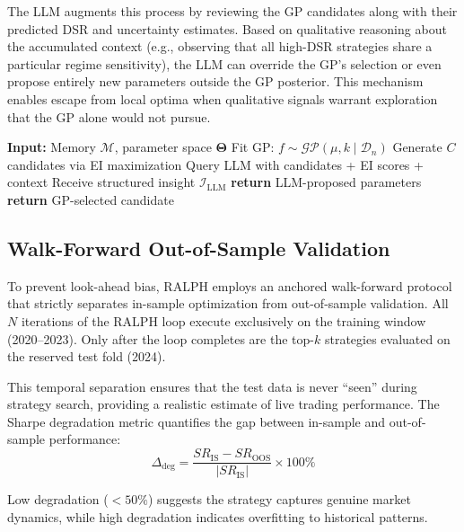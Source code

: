 \documentclass[conference]{IEEEtran}
\begin{document}
The LLM augments this process by reviewing the GP candidates along with their predicted DSR and uncertainty estimates. Based on qualitative reasoning about the accumulated context (e.g., observing that all high-DSR strategies share a particular regime sensitivity), the LLM can override the GP's selection or even propose entirely new parameters outside the GP posterior. This mechanism enables escape from local optima when qualitative signals warrant exploration that the GP alone would not pursue.

\begin{algorithm}[h!]
\caption{Agent 6: GP Mutator with LLM Override}
\label{alg:mutator}
\begin{algorithmic}[1]
\State \textbf{Input:} Memory $\mathcal{M}$, parameter space $\boldsymbol{\Theta}$
\State Fit GP: $f \sim \mathcal{GP}(\mu, k \mid \mathcal{D}_n)$
\State Generate $C$ candidates via EI maximization
\State Query LLM with candidates + EI scores + context
\State Receive structured insight $\mathcal{I}_{\text{LLM}}$
    \State \textbf{return} LLM-proposed parameters
\Else
    \State \textbf{return} GP-selected candidate
\EndIf
\end{algorithmic}
\end{algorithm}

\subsection{Walk-Forward Out-of-Sample Validation}

To prevent look-ahead bias, RALPH employs an anchored walk-forward protocol that strictly separates in-sample optimization from out-of-sample validation. All $N$ iterations of the RALPH loop execute exclusively on the training window (2020--2023). Only after the loop completes are the top-$k$ strategies evaluated on the reserved test fold (2024).

This temporal separation ensures that the test data is never ``seen'' during strategy search, providing a realistic estimate of live trading performance. The Sharpe degradation metric quantifies the gap between in-sample and out-of-sample performance:
\begin{equation}
    \Delta_{\text{deg}} = \frac{SR_{\text{IS}} - SR_{\text{OOS}}}{|SR_{\text{IS}}|} \times 100\%
\end{equation}

Low degradation ($< 50\%$) suggests the strategy captures genuine market dynamics, while high degradation indicates overfitting to historical patterns.
\end{document}
